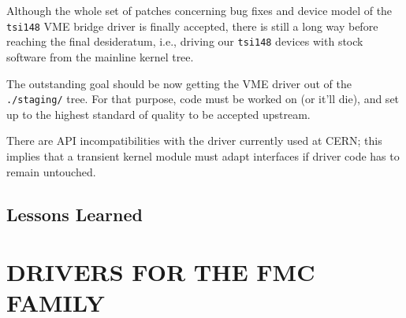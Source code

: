 \documentclass{JAC2003}
\begin{document}
Although the whole set of patches concerning bug
fixes and device model of the \verb|tsi148| VME bridge driver is
finally accepted, there is still a long way before reaching
the final desideratum, i.e., driving our \verb|tsi148| devices
with stock software from the mainline kernel tree.
\begin{Itemize}
\item The outstanding goal should be now getting the VME driver out
of the \verb|./staging/| tree. For that purpose, code must be worked on
(or it'll die), and set up to the highest standard of quality to be
accepted upstream.
\item There are API  incompatibilities with the driver currently used at
CERN; this implies that a transient kernel module must adapt interfaces
if driver code has to remain untouched.
\end{Itemize}

\subsection{Lessons Learned}

\section{DRIVERS FOR THE FMC FAMILY}
\end{document}
